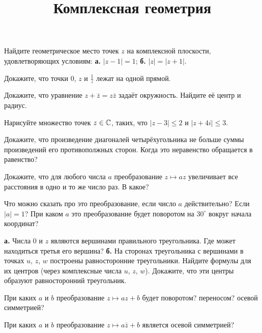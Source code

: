 \documentclass[a4paper, 12pt, num=23]{listok}
\begin{document}
\title{Комплексная геометрия}
\maketitle{}
\begin{problem}
	Найдите геометрическое место точек $z$ на комплексной плоскости, удовлетворяющих условиям: \textbf{а.} $|z - 1| = 1$; \textbf{б.} $|z| = |z + 1|$.
\end{problem}
\begin{problem}
	Докажите, что точки $0$, $z$ и $\frac1z$ лежат на одной прямой.
\end{problem}
\begin{problem}
	Докажите, что уравнение $z + \bar z = z\bar z$ задаёт окружность. Найдите её центр и радиус.
\end{problem}
\begin{problem}
	Нарисуйте множество точек $z \in \mathbb{C}$, таких, что $|z - 3| \le 2$ и $|z + 4i| \le 3$.
\end{problem}
\begin{problem}
	Докажите, что произведение диагоналей четырёхугольника не больше суммы произведений его противополжных сторон. Когда это неравенство обращается в равенство?
\end{problem}
\begin{problem}
	Докажите, что для любого числа $a$ преобразование $z \mapsto az$ увеличивает все расстояния в одно и то же число раз. В какое?
\end{problem}
\begin{problem}
	Что можно сказать про это преобразование, если число $a$ действительно? Если $|a| = 1$?
	При каком $a$ это преобразование будет поворотом на $30^\circ$ вокруг начала координат?
\end{problem}
\begin{problem}
	\textbf{а.} Числа $0$ и $z$ являются вершинами правильного треугольника.
	Где может находиться третья его вершина?
	\textbf{б.} На сторонах треугольника с вершинами в точках $u$, $z$, $w$ построены равносторонние треугольники.
	Найдите формулы для их центров (через комплексные числа $u$, $z$, $w$). Докажите, что эти центры образуют равносторонний треугольник.
\end{problem}
\begin{problem}
	При каких $a$ и $b$ преобразование $z \mapsto az + b$ будет поворотом? переносом? осевой симметрией?
\end{problem}
\begin{problem}
	При каких $a$ и $b$ преобразование $z \mapsto a\bar z + b$ является осевой симметрией?
\end{problem}
\end{document}
